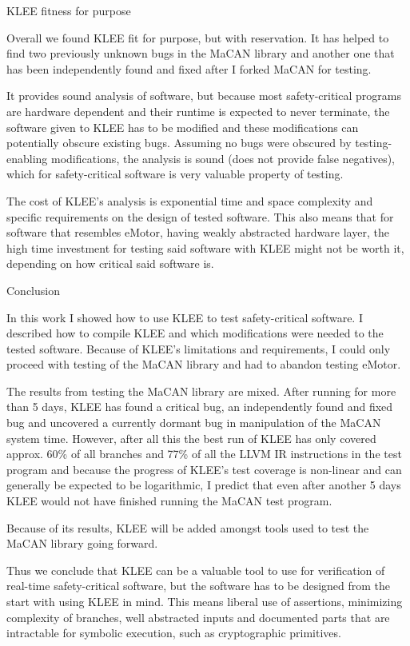 
\sec KLEE fitness for purpose

Overall we found KLEE fit for purpose, but with reservation. It has helped to
find two previously unknown bugs in the MaCAN library and another one that has
been independently found and fixed after I forked MaCAN for testing.

It provides sound analysis of software, but because most safety-critical
programs are hardware dependent and their runtime is expected to never
terminate, the software given to KLEE has to be modified and these
modifications can potentially obscure existing bugs.
Assuming no bugs were obscured by testing-enabling modifications, the analysis
is sound (does not provide false negatives), which for safety-critical software
is very valuable property of testing.

The cost of KLEE's analysis is exponential time and space complexity and
specific requirements on the design of tested software. This also means that
for software that resembles eMotor, having weakly abstracted hardware layer,
the high time investment for testing said software with KLEE might not be worth
it, depending on how critical said software is.




\chap Conclusion

In this work I showed how to use KLEE to test safety-critical software. I
described how to compile KLEE and which modifications were needed to the tested
software. Because of KLEE's limitations and requirements, I could only proceed
with testing of the MaCAN library and had to abandon testing eMotor.

The results from testing the MaCAN library are mixed. After running for more
than 5 days, KLEE has found a critical bug, an independently found and fixed
bug and uncovered a currently dormant bug in manipulation of the MaCAN system
time. However, after all this the best run of KLEE has only covered approx.
60\% of all branches and 77\% of all the LLVM IR instructions in the test
program and because the progress of KLEE's test coverage is non-linear and
can generally be expected to be logarithmic, I predict that even after another
5 days KLEE would not have finished running the MaCAN test program.

Because of its results, KLEE will be added amongst tools used to test the MaCAN
library going forward.

Thus we conclude that KLEE can be a valuable tool to use for verification of
real-time safety-critical software, but the software has to be designed from
the start with using KLEE in mind. This means liberal use of assertions,
minimizing complexity of branches, well abstracted inputs and documented parts
that are intractable for symbolic execution, such as cryptographic primitives.

